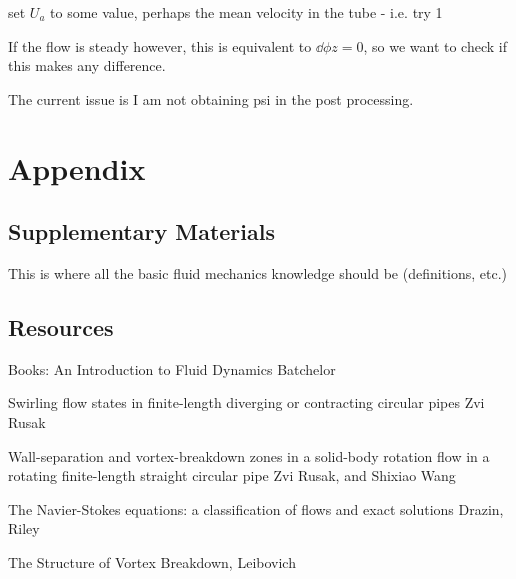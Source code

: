 \documentclass{X:/Documents/Coding/Latex/myreport}
\begin{document}
set $U_a$ to some value, perhaps the mean velocity in the tube - i.e. try 1

If the flow is steady however, this is equivalent to $\dd \phi z = 0$, so we want to check if this makes any difference.


The current issue is I am not obtaining psi in the post processing.







\clearpage
\section{Appendix}
\subsection{Supplementary Materials}
This is where all the basic fluid mechanics knowledge should be (definitions, etc.)

\subsection{Resources}
Books:
An Introduction to Fluid Dynamics
Batchelor

Swirling flow states in finite-length diverging or contracting circular pipes
Zvi Rusak


Wall-separation and vortex-breakdown zones in a solid-body rotation flow in a rotating finite-length straight circular pipe
Zvi Rusak, and Shixiao Wang

The Navier-Stokes equations: a classification of flows and exact solutions
Drazin, Riley


The Structure of Vortex Breakdown, 
Leibovich
\end{document}
